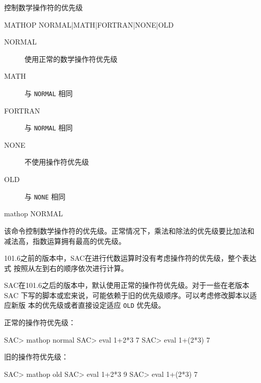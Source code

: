 \label{cmd:mathop}

控制数学操作符的优先级

\begin{SACSTX}
MATHOP NORMAL|MATH|FORTRAN|NONE|OLD
\end{SACSTX}

\begin{description}
\item [NORMAL] 使用正常的数学操作符优先级
\item [MATH] 与 \texttt{NORMAL} 相同
\item [FORTRAN] 与 \texttt{NORMAL} 相同
\item [NONE] 不使用操作符优先级
\item [OLD] 与 \texttt{NONE} 相同
\end{description}

\begin{SACDFT}
mathop NORMAL
\end{SACDFT}

该命令控制数学操作符的优先级。正常情况下，乘法和除法的优先级要比加法和
减法高，指数运算拥有最高的优先级。

101.6之前的版本中，SAC在进行代数运算时没有考虑操作符的优先级，整个表达式
按照从左到右的顺序依次进行计算。

SAC在101.6之后的版本中，默认使用正常的操作符优先级。对于一些在老版本SAC
下写的脚本或宏来说，可能依赖于旧的优先级顺序。可以考虑修改脚本以适应新版
本的优先级或者直接设定适应 \texttt{OLD} 优先级。

正常的操作符优先级：
\begin{SACCode}
SAC> mathop normal
SAC> eval 1+2*3
 7
SAC> eval 1+(2*3)
 7
\end{SACCode}

旧的操作符优先级：
\begin{SACCode}
SAC> mathop old
SAC> eval 1+2*3
 9
SAC> eval 1+(2*3)
 7
\end{SACCode}
